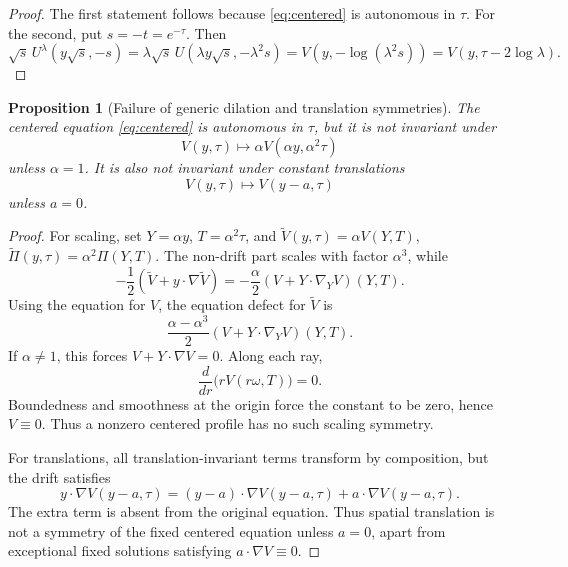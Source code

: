 \documentclass[11pt]{amsart}
\theoremstyle{plain}
\newtheorem{proposition}[theorem]{Proposition}
\theoremstyle{definition}
\theoremstyle{remark}
\numberwithin{equation}{section}
\begin{document}
\begin{proof}
The first statement follows because \eqref{eq:centered} is autonomous in
\(\tau\).  For the second, put \(s=-t=e^{-\tau}\).  Then
\[
   \sqrt{s}\,U^\lambda(y\sqrt{s},-s)
   =
   \lambda\sqrt{s}\,U(\lambda y\sqrt{s},-\lambda^2s)
   =
   V(y,-\log(\lambda^2s))
   =
   V(y,\tau-2\log\lambda).
\]
\end{proof}

\begin{proposition}[Failure of generic dilation and translation symmetries]
\label{prop:no-cascade}
The centered equation \eqref{eq:centered} is autonomous in \(\tau\), but it is
not invariant under
\[
   V(y,\tau)\mapsto \alpha V(\alpha y,\alpha^2\tau)
\]
unless \(\alpha=1\).  It is also not invariant under constant translations
\[
   V(y,\tau)\mapsto V(y-a,\tau)
\]
unless \(a=0\).
\end{proposition}

\begin{proof}
For scaling, set \(Y=\alpha y\), \(T=\alpha^2\tau\), and
\(\widetilde V(y,\tau)=\alpha V(Y,T)\),
\(\widetilde\Pi(y,\tau)=\alpha^2\Pi(Y,T)\).  The non-drift part scales with
factor \(\alpha^3\), while
\[
   -\frac12(\widetilde V+y\cdot\nabla\widetilde V)
   =
   -\frac{\alpha}{2}(V+Y\cdot\nabla_YV)(Y,T).
\]
Using the equation for \(V\), the equation defect for \(\widetilde V\) is
\[
   \frac{\alpha-\alpha^3}{2}(V+Y\cdot\nabla_YV)(Y,T).
\]
If \(\alpha\ne1\), this forces \(V+Y\cdot\nabla V=0\).  Along each ray,
\[
   \frac{d}{dr}\bigl(rV(r\omega,T)\bigr)=0.
\]
Boundedness and smoothness at the origin force the constant to be zero, hence
\(V\equiv0\).  Thus a nonzero centered profile has no such scaling symmetry.

For translations, all translation-invariant terms transform by composition,
but the drift satisfies
\[
   y\cdot\nabla V(y-a,\tau)
   =
   (y-a)\cdot\nabla V(y-a,\tau)+a\cdot\nabla V(y-a,\tau).
\]
The extra term is absent from the original equation.  Thus spatial
translation is not a symmetry of the fixed centered equation unless \(a=0\),
apart from exceptional fixed solutions satisfying \(a\cdot\nabla V\equiv0\).
\end{proof}
\end{document}
